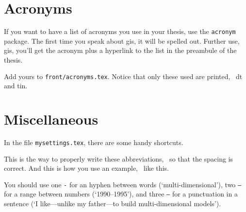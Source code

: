%
\section{Acronyms}%
\label{sec:acronyms}

If you want to have a list of acronyms you use in your thesis, use the \texttt{acronym} package.
The first time you speak about \ac{gis}, it will be spelled out. 
Further use, \ac{gis}, you'll get the acronym plus a hyperlink to the list in the preambule of the thesis.

Add yours to \texttt{front/acronyms.tex}.
Notice that only these used are printed, \eg\ \ac{dt} and \ac{tin}.


%
\section{Miscellaneous}%
\label{sec:misc}

In the file \texttt{mysettings.tex}, there are some handy shortcuts.

This is the way to properly write these abbreviations, \ie\ so that the spacing is correct.
And this is how you use an example, \eg\ like this.

You should use one \texttt{-} for an hyphen between words (`multi-dimensional'), two \texttt{--} for a range between numbers (`1990--1995'), and three \texttt{---} for a punctuation in a sentence (`I like---unlike my father---to build multi-dimensional models').

